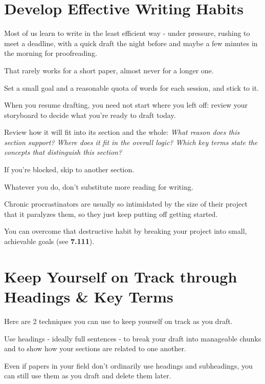 \documentclass[oneside]{book}
\numberwithin{equation}{section}
\begin{document}
\section{Develop Effective Writing Habits}
Most of us learn to write in the least efficient way - under pressure, rushing to meet a deadline, with a quick draft the night before and maybe a few minutes in the morning for proofreading.

That rarely works for a short paper, almost never for a longer one.


%

Set a small goal and a reasonable quota of words for each session, and stick to it.

When you resume drafting, you need not start where you left off: review your storyboard to decide what you're ready to draft today.

Review how it will fit into its section and the whole: \textit{What reason does this section support? Where does it fit in the overall logic? Which key terms state the concepts that distinguish this section?}

If you're blocked, skip to another section.

Whatever you do, don't substitute more reading for writing.

Chronic procrastinators are usually so intimidated by the size of their project that it paralyzes them, so they just keep putting off getting started.

You can overcome that destructive habit by breaking your project into small, achievable goals (see \textbf{7.111}).

\section{Keep Yourself on Track through Headings \& Key Terms}
Here are 2 techniques you can use to keep yourself on track as you draft.

%
Use headings - ideally full sentences - to break your draft into manageable chunks and to show how your sections are related to one another.

Even if papers in your field don't ordinarily use headings and subheadings, you can still use them as you draft and delete them later.
\end{document}
